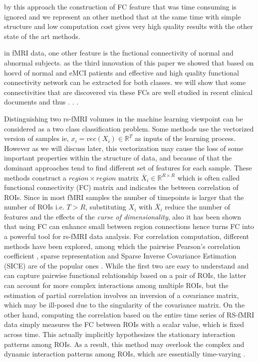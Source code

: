 \documentclass[journal]{IEEEtran}
\begin{document}
	by this approach the construction of FC feature that was time consuming is ignored and we represent an other method that at the same time with simple structure and low computation cost gives very high quality results with the other state of the art methods. 
	
	in fMRI data, one other feature is the fnctional connectivity of normal and abnormal subjects. as the third innovation of this paper we showed that based on hosvd of normal and eMCI patients and effective and high quality functional connectivity network can be extracted for both classes. we will show that some connectivities that are discovered via these FCs are well studied in recent clinical documents and thus . . . 
	
	
	
	Distinguishing two rs-fMRI volumes in the machine learning viewpoint can be considered as a two class classification problem.
	Some methods use the vectorized version of samples ie, $x_i = vec(X_i)\in \mathbb{R}^T$ as  inputs of the learning process. However as we will discuss later, this vectorization may cause the loss of some important properties within the structure of data, and because of that the dominant approaches tend to find different set of features for each sample. These methods  construct a $region \times region$ matrix $\bar{X}_i \in \mathbb{R}^{R \times R}$ which is often called functional connectivity (FC) matrix and indicates the between correlation of ROIs. Since in most fMRI samples the number of timepoints is larger that the number of ROIs i.e.  $ T  > R$, substituting $X_i$ with $\bar{X}_i$ reduce the number of features and the effects of the \textit{curse of dimensionality}, also 
	it has been shown that using FC can enhance small between region connections hence turns FC into a powerful tool for rs-fMRI data analysis. For correlation computation, different methods have been explored, among which the pairwise Pearson’s correlation coefficient \cite{r10, r11}, sparse representation \cite{r10, r12, r13}  and Sparse Inverse Covariance Estimation (SICE) are of the popular ones \cite{r14, r15}. While the first two are easy to understand and can capture pairwise functional relationship based on a pair of ROIs, the latter can account for more complex interactions among multiple ROIs, but the estimation of partial correlation involves an inversion of a covariance matrix, which may be ill-posed due to the singularity of the covariance matrix. On the other hand, computing the correlation based on the entire time series of RS-fMRI data simply measures the FC between ROIs with a scalar value, which is fixed across time. This actually implicitly hypothesizes the stationary interaction patterns among ROIs. As a result, this method may overlook the complex and dynamic interaction patterns among ROIs, which are essentially time-varying \cite{r16}\textendash \cite{r19}.
\end{document}
